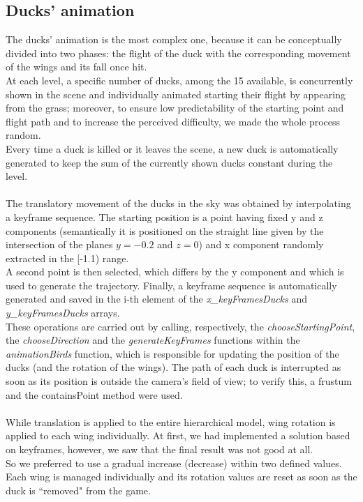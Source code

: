 \documentclass[12pt,a4paper]{article}
\begin{document}
	\subsection{Ducks' animation}
	The ducks' animation is the most complex one, because it can be conceptually divided into two phases: the flight of the duck with the corresponding movement of the wings and its fall once hit.\\ 
	At each level, a specific number of ducks, among the 15 available, is concurrently shown in the scene and individually animated starting their flight by appearing from the grass; moreover, to ensure low predictability of the starting point and flight path and to increase the perceived difficulty, we made the whole process random.\\
	Every time a duck is killed or it leaves the scene, a new duck is automatically generated to keep the sum of the currently shown ducks constant during the level.\\
	\\
	The translatory movement of the ducks in the sky was obtained by interpolating a keyframe sequence. 
	The starting position is a point having fixed y and z components (semantically it is positioned on the straight line given by the intersection of the planes $y=-0.2$ and $z=0	$) and x component randomly extracted in the [-1.1) range.\\
	A second point is then selected, which differs by the y component and which is used to generate the trajectory. Finally, a keyframe sequence is automatically generated and saved in the i-th element of the \textit{x\_keyFramesDucks} and \textit{y\_keyFramesDucks} arrays.\\
	These operations are carried out by calling, respectively, the \textit{chooseStartingPoint}, the \textit{chooseDirection} and the \textit{generateKeyFrames} functions within the \textit{animationBirds} function, which is responsible for updating the position of the ducks (and the rotation of the wings). The path of each duck is interrupted as soon as its position is outside the camera's field of view; to verify this, a frustum and the containsPoint method were used.\\
	\\
	While translation is applied to the entire hierarchical model, wing rotation is applied to each wing individually. At first, we had implemented a solution based on keyframes, however, we saw that the final result was not good at all.\\
	So we preferred to use a gradual increase (decrease) within two defined values. Each wing is managed individually and its rotation values are reset as soon as the duck is ``removed" from the game.\\
\end{document}
